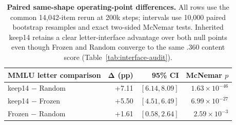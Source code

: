 \begin{table}[t]
\centering
\scriptsize
\setlength{\tabcolsep}{3.0pt}
\begin{tabular}{@{}lrrr@{}}
\toprule
\textbf{MMLU letter comparison} & $\boldsymbol{\Delta}$ \textbf{(pp)} &
\textbf{95\% CI} & \textbf{McNemar $p$} \\
\midrule
keep14 $-$ Random & +7.11 & $[6.14,8.09]$ & $1.63{\times}10^{-46}$ \\
keep14 $-$ Frozen & +5.50 & $[4.51,6.49]$ & $6.99{\times}10^{-27}$ \\
Frozen $-$ Random & +1.61 & $[0.58,2.64]$ & $2.59{\times}10^{-3}$ \\
\bottomrule
\end{tabular}
\caption{\textbf{Paired same-shape operating-point differences.} All rows use
the common 14,042-item rerun at 200k steps; intervals use 10,000 paired
bootstrap resamples and exact two-sided McNemar tests. Inherited keep14 retains
a clear letter-interface advantage over both null points even though Frozen and
Random converge to the same .360 content score
(Table~\ref{tab:interface-audit}).}
\label{tab:paired-operating-points}
\end{table}
